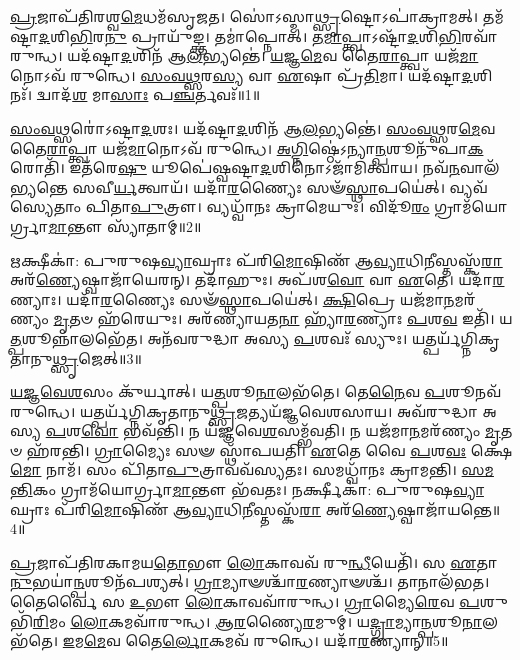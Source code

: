 \setcounter{anuvakam}{0}

\-\ul{𑌪𑍍𑌰}\-𑌜𑌾𑌪᳴𑌤𑌿𑌰𑌶𑍍𑌵\-\ul{𑌮𑍇}\-𑌧𑌮᳴\-𑌸𑍃𑌜𑌤।
𑌸𑍋॑𑌽𑌸𑍍𑌮𑌾\-\ul{𑌥𑍍𑌸𑍃}\-𑌷𑍍𑌟𑍋\-𑌽𑌪𑌾॑𑌕𑍍𑌰𑌾𑌮𑌤𑍍।
𑌤𑌮᳴𑌷𑍍𑌟𑌾\-\ul{𑌦}\-𑌶𑌿\-\ul{𑌭𑌿}\-𑌰\-\ul{𑌨𑍁}\- 𑌪𑍍𑌰𑌾𑌯𑍁᳴𑌙𑍍𑌕𑍍𑌤।
𑌤𑌮𑌾॑𑌪𑍍𑌨𑍋𑌤𑍍।
𑌤\-\ul{𑌮𑌾}\-𑌪𑍍𑌤𑍍𑌵𑌾\-𑌽𑌷𑍍𑌟𑌾᳴\-\ul{𑌦}\-𑌶𑌿\-\ul{𑌭𑌿}\-𑌰𑌵𑌾᳴\-𑌰𑍁𑌨𑍍𑌧।
𑌯𑌦᳴𑌷𑍍𑌟𑌾\-\ul{𑌦}\-𑌶𑌿𑌨᳴ 𑌆\-\ul{𑌲}\-𑌭𑍍𑌯𑌨𑍍𑌤𑍇॑।
\-\ul{𑌯}\-𑌜𑍍𑌞\-\ul{𑌮𑍇}\-𑌵 𑌤𑍈\-\ul{𑌰𑌾}\-𑌪𑍍𑌤𑍍𑌵𑌾 𑌯𑌜᳴\-\ul{𑌮𑌾}\-𑌨𑍋\-𑌽𑌵᳴ 𑌰𑍁𑌨𑍍𑌧𑍇।
\-\ul{𑌸𑌂}\-\-\ul{𑌵}\-\-\ul{𑌥𑍍𑌸}\-𑌰\-\ul{𑌸𑍍𑌯} 𑌵𑌾 \ul{𑌏}\-𑌷𑌾 𑌪𑍍𑌰᳴\-\ul{𑌤𑌿}\-𑌮𑌾।
𑌯𑌦᳴𑌷𑍍𑌟𑌾\-\ul{𑌦}\-𑌶𑌿𑌨𑌃᳴।
𑌦𑍍𑌵𑌾𑌦᳴\-\ul{𑌶} 𑌮𑌾\-\ul{𑌸𑌾𑌃} 𑌪\-\ul{𑌞𑍍𑌚}\-𑌰𑍍𑌤𑌵𑌃᳴॥1॥

\-\ul{𑌸𑌂}\-\-\ul{𑌵}\-\-\ul{𑌥𑍍𑌸}\-𑌰𑍋॑\-𑌽𑌷𑍍𑌟𑌾\-\ul{𑌦}\-𑌶𑌃।
𑌯𑌦᳴𑌷𑍍𑌟𑌾\-\ul{𑌦}\-𑌶𑌿𑌨᳴ 𑌆\-\ul{𑌲}\-𑌭𑍍𑌯𑌨𑍍𑌤𑍇॑।
\-\ul{𑌸𑌂}\-\-\ul{𑌵}\-\-\ul{𑌥𑍍𑌸}\-𑌰\-\ul{𑌮𑍇}\-𑌵 𑌤𑍈\-\ul{𑌰𑌾}\-𑌪𑍍𑌤𑍍𑌵𑌾 𑌯𑌜᳴\-\ul{𑌮𑌾}\-𑌨𑍋\-𑌽𑌵᳴ 𑌰𑍁𑌨𑍍𑌧𑍇।
\-\ul{𑌅}\-\-\ul{𑌗𑍍𑌨𑌿}\-𑌷𑍍𑌠𑍇॑\-𑌽𑌨𑍍𑌯𑌾\-\ul{𑌨𑍍𑌪}\-𑌶𑍂𑌨𑍁᳴𑌪𑌾\-\ul{𑌕}\-𑌰𑍋𑌤𑌿᳴।
𑌇𑌤᳴𑌰𑍇\-\ul{𑌷𑍁} 𑌯𑍂𑌪𑍇॑𑌷𑍍𑌵𑌷𑍍𑌟𑌾\-\ul{𑌦}\-𑌶𑌿𑌨𑍋\-𑌽𑌜𑌾᳴𑌮𑌿𑌤𑍍𑌵𑌾𑌯।
𑌨𑌵᳴\-\ul{𑌨}\-𑌵𑌾𑌲᳴𑌭𑍍𑌯𑌨𑍍𑌤𑍇 𑌸𑌵𑍀\-\ul{𑌰𑍍𑌯}\-𑌤𑍍𑌵𑌾𑌯᳴।
𑌯𑌦𑌾᳴\-\ul{𑌰}\-𑌣𑍍𑌯𑍈𑌃 𑌸𑍟᳴\-\ul{𑌸𑍍𑌥𑌾}\-𑌪𑌯𑍇॑𑌤𑍍।
𑌵𑍍𑌯𑌵᳴𑌸𑍍𑌯𑍇𑌤𑌾𑌂 𑌪𑌿𑌤𑌾\-\ul{𑌪𑍁}\-𑌤𑍍𑌰𑍗।
𑌵𑍍𑌯𑌧𑍍𑌵𑌾᳴𑌨𑌃 𑌕𑍍𑌰𑌾𑌮𑍇𑌯𑍁𑌃।
𑌵𑌿𑌦𑍂᳴\-\ul{𑌰𑌂} 𑌗𑍍𑌰𑌾𑌮᳴𑌯𑍋𑌰𑍍𑌗𑍍𑌰𑌾\-\ul{𑌮𑌾}\-𑌨𑍍𑌤𑍗 𑌸𑍍𑌯𑌾᳴𑌤𑌾𑌮𑍍॥2॥

\-\ul{𑌋}\-𑌕𑍍𑌷𑍀𑌕𑌾॑: 𑌪𑍁𑌰𑍁𑌷\-\ul{𑌵𑍍𑌯𑌾}\-𑌘𑍍𑌰𑌾𑌃 𑌪᳴𑌰𑌿\-\ul{𑌮𑍋}\-𑌷𑌿𑌣᳴ 𑌆\-\ul{𑌵𑍍𑌯𑌾}\-𑌧𑌿\-\ul{𑌨𑍀}\-𑌸𑍍𑌤𑌸𑍍𑌕᳴\-\ul{𑌰𑌾} 𑌅𑌰᳴\-\ul{𑌣𑍍𑌯𑍇}\-𑌷𑍍𑌵𑌾𑌜𑌾᳴𑌯𑍇𑌰𑌨𑍍।
𑌤𑌦𑌾᳴𑌹𑍁𑌃।
𑌅𑌪᳴𑌶\-\ul{𑌵𑍋} 𑌵𑌾 \ul{𑌏}\-𑌤𑍇।
𑌯𑌦𑌾᳴\-\ul{𑌰}\-𑌣𑍍𑌯𑌾𑌃।
𑌯𑌦𑌾᳴\-\ul{𑌰}\-𑌣𑍍𑌯𑍈𑌃 𑌸𑍟᳴\-\ul{𑌸𑍍𑌥𑌾}\-𑌪𑌯𑍇॑𑌤𑍍।
\-\ul{𑌕𑍍𑌷𑌿}\-𑌪𑍍𑌰𑍇 𑌯𑌜᳴𑌮𑌾\-\ul{𑌨}\-𑌮𑌰᳴𑌣𑍍𑌯𑌂 \ul{𑌮𑍃}\-𑌤𑍞 𑌹᳴𑌰𑍇𑌯𑍁𑌃।
𑌅𑌰᳴𑌣𑍍𑌯𑌾𑌯𑌤\-\ul{𑌨𑌾} 𑌹𑍍𑌯𑌾᳴\-\ul{𑌰}\-𑌣𑍍𑌯𑌾𑌃 \ul{𑌪}\-𑌶\-\ul{𑌵} 𑌇𑌤𑌿᳴।
𑌯\-\ul{𑌤𑍍𑌪}\-𑌶𑍂𑌨𑍍𑌨𑌾𑌲𑌭𑍇᳴𑌤।
𑌅𑌨᳴𑌵𑌰𑍁𑌦𑍍𑌧𑌾 𑌅𑌸𑍍𑌯 \ul{𑌪}\-𑌶𑌵𑌃᳴ 𑌸𑍍𑌯𑍁𑌃।
𑌯𑌤𑍍𑌪𑌰𑍍𑌯᳴𑌗𑍍𑌨𑌿𑌕𑍃𑌤𑌾𑌨𑍁\-\ul{𑌥𑍍𑌸𑍃}\-𑌜𑍇𑌤𑍍॥3॥

\-\ul{𑌯}\-\-\ul{𑌜𑍍𑌞}\-\-\ul{𑌵𑍇}\-\-\ul{𑌶}\-𑌸𑌂 𑌕𑍁᳴𑌰𑍍𑌯𑌾𑌤𑍍।
𑌯\-\ul{𑌤𑍍𑌪}\-𑌶𑍂\-\ul{𑌨𑌾}\-𑌲𑌭᳴𑌤𑍇।
𑌤𑍇\-\ul{𑌨𑍈}\-𑌵 \ul{𑌪}\-𑌶𑍂𑌨𑌵᳴ 𑌰𑍁𑌨𑍍𑌧𑍇।
𑌯𑌤𑍍𑌪𑌰𑍍𑌯᳴𑌗𑍍𑌨𑌿𑌕𑍃𑌤𑌾𑌨𑍁\-\ul{𑌥𑍍𑌸𑍃}\-𑌜𑌤𑍍𑌯𑌯᳴𑌜𑍍𑌞𑌵𑍇𑌶𑌸𑌾𑌯।
𑌅𑌵᳴𑌰𑍁𑌦𑍍𑌧𑌾 𑌅𑌸𑍍𑌯 \ul{𑌪}\-𑌶\-\ul{𑌵𑍋} 𑌭𑌵᳴𑌨𑍍𑌤𑌿।
𑌨 𑌯᳴𑌜𑍍𑌞𑌵𑍇\-\ul{𑌶}\-𑌸𑌮𑍍𑌭᳴𑌵𑌤𑌿।
𑌨 𑌯𑌜᳴𑌮𑌾\-\ul{𑌨}\-𑌮𑌰᳴𑌣𑍍𑌯𑌂 \ul{𑌮𑍃}\-𑌤𑍞 𑌹᳴𑌰𑌨𑍍𑌤𑌿।
\-\ul{𑌗𑍍𑌰𑌾}\-𑌮𑍍𑌯𑍈𑌃 𑌸𑍟 𑌸𑍍𑌥𑌾᳴𑌪𑌯𑌤𑌿।
\-\ul{𑌏}\-𑌤𑍇 𑌵𑍈 \ul{𑌪}\-𑌶\-\ul{𑌵𑌃} 𑌕𑍍𑌷𑍇\-\ul{𑌮𑍋} 𑌨𑌾𑌮᳴।
𑌸𑌂 𑌪𑌿᳴𑌤𑌾\-\ul{𑌪𑍁}\-𑌤𑍍𑌰𑌾𑌵𑌵᳴𑌸𑍍𑌯𑌤𑌃।
𑌸𑌮𑌧𑍍𑌵𑌾᳴𑌨𑌃 𑌕𑍍𑌰𑌾𑌮𑌨𑍍𑌤𑌿।
\-\ul{𑌸}\-\-\ul{𑌮}\-\-\ul{𑌨𑍍𑌤𑌿}\-𑌕𑌂 𑌗𑍍𑌰𑌾𑌮᳴𑌯𑍋𑌰𑍍𑌗𑍍𑌰𑌾\-\ul{𑌮𑌾}\-𑌨𑍍𑌤𑍗 𑌭᳴𑌵𑌤𑌃।
𑌨𑌰𑍍𑌕𑍍𑌷𑍀𑌕𑌾॑: 𑌪𑍁𑌰𑍁𑌷\-\ul{𑌵𑍍𑌯𑌾}\-𑌘𑍍𑌰𑌾𑌃 𑌪᳴𑌰𑌿\-\ul{𑌮𑍋}\-𑌷𑌿𑌣᳴ 𑌆\-\ul{𑌵𑍍𑌯𑌾}\-𑌧𑌿\-\ul{𑌨𑍀}\-𑌸𑍍𑌤𑌸𑍍𑌕᳴\-\ul{𑌰𑌾} 𑌅𑌰᳴\-\ul{𑌣𑍍𑌯𑍇}\-𑌷𑍍𑌵𑌾𑌜𑌾᳴𑌯𑌨𑍍𑌤𑍇॥4॥\anuvakamend[\-\ul{𑌋}\-𑌤𑌵𑌃᳴ 𑌸𑍍𑌯𑌾𑌤𑌾𑌮𑍁\-\ul{𑌥𑍍𑌸𑍃}\-𑌜𑍇𑌥𑍍𑌸𑍍𑌯᳴\-\ul{𑌤}\-𑌸𑍍𑌤𑍍𑌰𑍀𑌣𑌿᳴ 𑌚]

\-\ul{𑌪𑍍𑌰}\-𑌜𑌾𑌪᳴𑌤𑌿𑌰𑌕𑌾𑌮𑌯\-\ul{𑌤𑍋}\-𑌭𑍗 \ul{𑌲𑍋}\-𑌕𑌾𑌵𑌵᳴ 𑌰𑍁\-\ul{𑌨𑍍𑌧𑍀}\-𑌯𑍇𑌤𑌿᳴।
𑌸 \ul{𑌏}\-𑌤𑌾\-\ul{𑌨𑍁}\-𑌭𑌯𑌾॑\-\ul{𑌨𑍍𑌪}\-𑌶𑍂𑌨᳴𑌪𑌶𑍍𑌯𑌤𑍍।
\-\ul{𑌗𑍍𑌰𑌾}\-𑌮𑍍𑌯𑌾𑍟𑌶𑍍𑌚𑌾᳴\-\ul{𑌰}\-𑌣𑍍𑌯𑌾𑍟𑌶𑍍𑌚᳴।
𑌤𑌾𑌨𑌾𑌲᳴𑌭𑌤।
𑌤𑍈𑌰𑍍𑌵𑍈 𑌸 \ul{𑌉}\-𑌭𑍗 \ul{𑌲𑍋}\-𑌕𑌾𑌵𑌵𑌾᳴𑌰𑍁𑌨𑍍𑌧।
\-\ul{𑌗𑍍𑌰𑌾}\-𑌮𑍍𑌯𑍈\-\ul{𑌰𑍇}\-𑌵 \ul{𑌪}\-𑌶𑍁𑌭𑌿᳴\-\ul{𑌰𑌿}\-𑌮𑌂 \ul{𑌲𑍋}\-𑌕𑌮𑌵𑌾᳴𑌰𑍁𑌨𑍍𑌧।
\-\ul{𑌆}\-\-\ul{𑌰}\-𑌣𑍍𑌯𑍈\-\ul{𑌰}\-𑌮𑍁𑌮𑍍।
𑌯\-\ul{𑌦𑍍𑌗𑍍𑌰𑌾}\-𑌮𑍍𑌯𑌾\-\ul{𑌨𑍍𑌪}\-𑌶𑍂\-\ul{𑌨𑌾}\-𑌲𑌭᳴𑌤𑍇।
\-\ul{𑌇}\-𑌮\-\ul{𑌮𑍇}\-𑌵 𑌤𑍈\-\ul{𑌰𑍍𑌲𑍋}\-𑌕𑌮𑌵᳴ 𑌰𑍁𑌨𑍍𑌧𑍇।
𑌯𑌦𑌾᳴\-\ul{𑌰}\-𑌣𑍍𑌯𑌾𑌨𑍍॥5॥

